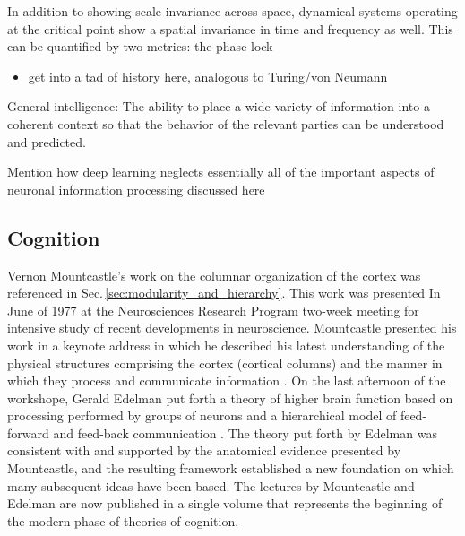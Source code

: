 In addition to showing scale invariance across space, dynamical systems operating at the critical point show a spatial invariance in time and frequency as well. This can be quantified by two metrics: the phase-lock

\begin{itemize}
\item get into a tad of history here, analogous to Turing/von Neumann
\end{itemize}

General intelligence: The ability to place a wide variety of information into a coherent context so that the behavior of the relevant parties can be understood and predicted.

Mention how deep learning neglects essentially all of the important aspects of neuronal information processing discussed here

\subsection{\label{sec:cognition}Cognition}
Vernon Mountcastle's work on the columnar organization of the cortex was referenced in Sec.\,\ref{sec:modularity_and_hierarchy}. This work was presented In June of 1977 at the Neurosciences Research Program two-week meeting for intensive study of recent developments in neuroscience. Mountcastle presented his work in a keynote address in which he described his latest understanding of the physical structures comprising the cortex (cortical columns) and the manner in which they process and communicate information \cite{mo1978}. On the last afternoon of the workshope, Gerald Edelman put forth a theory of higher brain function based on processing performed by groups of neurons and a hierarchical model of feed-forward and feed-back communication \cite{ed1978}. The theory put forth by Edelman was consistent with and supported by the anatomical evidence presented by Mountcastle, and the resulting framework established a new foundation on which many subsequent ideas have been based. The lectures by Mountcastle and Edelman are now published in a single volume \cite{edmo1978} that represents the beginning of the modern phase of theories of cognition.

